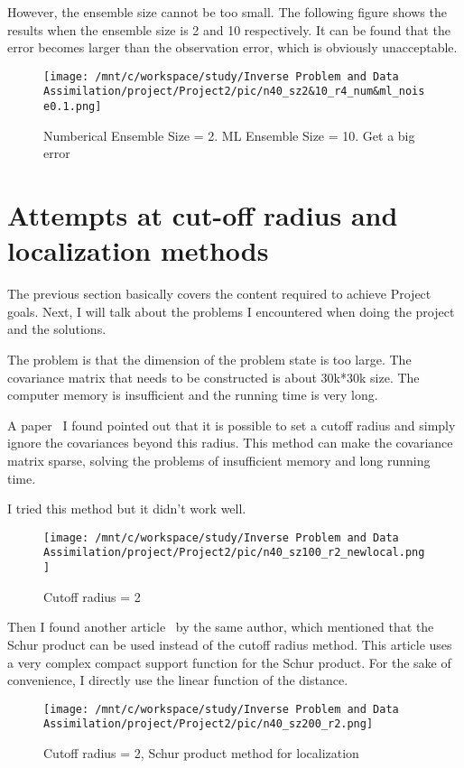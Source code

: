 \documentclass[11pt,reqno]{amsart}
\begin{document}
However, the ensemble size cannot be too small. The following figure shows the results when the ensemble size is 2 and 10 respectively. It can be found that the error becomes larger than the observation error, which is obviously unacceptable.

\begin{figure}[htbp]
  \centering
      \texttt{[image: /mnt/c/workspace/study/Inverse Problem and Data Assimilation/project/Project2/pic/n40\_sz2\&10\_r4\_num\&ml\_noise0.1.png]} %
      \caption{Numberical Ensemble Size = 2. ML Ensemble Size = 10. Get a big error}
      \label{fig:ensemble-size-2}
\end{figure}

\section{Attempts at cut-off radius and localization methods}

The previous section basically covers the content required to achieve Project goals. Next, I will talk about the problems I encountered when doing the project and the solutions.

The problem is that the dimension of the problem state is too large. The covariance matrix that needs to be constructed is about 30k*30k size. The computer memory is insufficient and the running time is very long.

A paper~\cite{houtekamer_1998} I found pointed out that it is possible to set a cutoff radius and simply ignore the covariances beyond this radius.
This method can make the covariance matrix sparse, solving the problems of insufficient memory and long running time.

I tried this method but it didn't work well.
\begin{figure}[H]
  \centering
      \texttt{[image: /mnt/c/workspace/study/Inverse Problem and Data Assimilation/project/Project2/pic/n40\_sz100\_r2\_newlocal.png]} %
      \caption{Cutoff radius = 2}
\end{figure}

Then I found another article~\cite{houtekamer_2001} by the same author, which mentioned that the Schur product can be used instead of the cutoff radius method. This article uses a very complex compact support function for the Schur product. For the sake of convenience, I directly use the linear function of the distance.

\begin{figure}[H]
  \centering
      \texttt{[image: /mnt/c/workspace/study/Inverse Problem and Data Assimilation/project/Project2/pic/n40\_sz200\_r2.png]} %
      \caption{Cutoff radius = 2, Schur product method for localization}
\end{figure}
\end{document}

